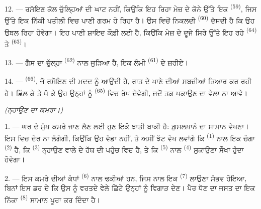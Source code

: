 12. --- ਰਸੋਇਣ ਕੋਲ ਚੁੱਲ੍ਹਿਆਂ ਦੀ ਘਾਟ ਨਹੀਂ, ਕਿਉਂਕਿ ਇਹ ਰਿਹਾ ਮੇਜ਼ ਦੇ ਕੋਨੇ ਉੱਤੇ ਇਕ
 \textsuperscript{(59)}, ਜਿਸ ਉੱਤੇ ਇਕ ਨਿੱਕੀ ਪਤੀਲੀ ਵਿਚ ਪਾਣੀ
ਗਰਮ ਹੋ ਰਿਹਾ ਹੈ। ਉਸ ਵਿਚੋਂ ਨਿਕਲਦੀ  \textsuperscript{(60)} ਦੱਸਦੀ ਹੈ ਕਿ
ਉਹ ਉਬਲ ਰਿਹਾ ਹੋਵੇਗਾ। ਇਹ ਪਾਣੀ ਸ਼ਾਇਦ ਕੌਫ਼ੀ ਲਈ ਹੈ, ਕਿਉਂਕਿ ਮੇਜ਼ ਦੇ ਦੂਜੇ ਸਿਰੇ ਉੱਤੇ ਇਹ
ਰਹੇ  \textsuperscript{(64)} ਤੇ 
\textsuperscript{(63)}।

13. --- ਗੈਸ ਦਾ ਚੁੱਲ੍ਹਾ  \textsuperscript{(62)} ਨਾਲ ਜੁੜਿਆ ਹੈ,
ਇਕ ਲੰਮੀ  \textsuperscript{(61)} ਦੇ ਜ਼ਰੀਏ।

14. ---  \textsuperscript{(66)}, ਜੋ ਰਸੋਇਣ ਦੀ ਮਦਦ ਨੂੰ
ਆਉਂਦੀ ਹੈ, ਰਾਤ ਦੇ ਖਾਣੇ ਦੀਆਂ ਸਬਜ਼ੀਆਂ ਤਿਆਰ ਕਰ ਰਹੀ ਹੈ। ਛਿੱਲ ਕੇ ਤੇ ਧੋ ਕੇ ਉਹ ਉਨ੍ਹਾਂ
ਨੂੰ  \textsuperscript{(65)} ਵਿਚ ਰੱਖ ਦੇਵੇਗੀ, ਜਦੋਂ ਤਕ ਪਕਾਉਣ ਦਾ ਵੇਲਾ ਨਾ
ਆਵੇ।

\VUsaut{4.0mm}
{\centering\fontsize{10.2pt}{10.2pt}\selectfont{} \textit{(ਨ੍ਹਾਉਣ ਦਾ ਕਮਰਾ।)}\par}
\VUsaut{3.0mm}

1. --- ਘਰ ਦੇ ਮੁੱਖ ਕਮਰੇ ਜਾਣ ਲੈਣ ਲਈ ਹੁਣ ਇਕੋ ਝਾਤੀ ਬਾਕੀ ਹੈ: ਗ਼ੁਸਲਖ਼ਾਨੇ ਦਾ ਸਾਮਾਨ
ਵੇਖਣਾ। ਇਸ ਵਿਚ ਦੇਰ ਨਾ ਲੱਗੇਗੀ, ਕਿਉਂਕਿ ਉਹ ਵੱਡਾ ਨਹੀਂ, ਤੇ ਅਸੀਂ ਝੱਟ ਵੇਖ ਲਵਾਂਗੇ ਕਿ
 \textsuperscript{(1)} ਨਾਲ ਇਕ ਚੰਗਾ  \textsuperscript{(2)} ਹੈ, ਕਿ  \textsuperscript{(3)} ਨ੍ਹਾਉਣ
ਵਾਲੇ ਦੇ ਹੱਥ ਦੀ ਪਹੁੰਚ ਵਿਚ ਹੈ, ਤੇ ਕਿ  \textsuperscript{(5)}
ਨਾਲ  \textsuperscript{(4)} ਸੁਕਾਉਣਾ ਸੌਖਾ ਹੁੰਦਾ ਹੋਵੇਗਾ।

2. --- ਇਸ ਕਮਰੇ ਦੀਆਂ ਕੰਧਾਂ  \textsuperscript{(6)} ਨਾਲ ਢਕੀਆਂ
ਹਨ, ਜਿਸ ਨਾਲ ਇਕ  \textsuperscript{(7)} ਲਾਉਣਾ ਸੰਭਵ ਹੋਇਆ, ਬਿਨਾਂ ਇਸ ਡਰ
ਦੇ ਕਿ ਉਸ ਨੂੰ ਵਰਤਦੇ ਵੇਲੇ ਛਿੱਟੇ ਉਨ੍ਹਾਂ ਨੂੰ ਵਿਗਾੜ ਦੇਣ। ਪੈਰ ਧੋਣ ਦਾ ਜਸਤ ਦਾ ਇਕ ਨਿੱਕਾ
 \textsuperscript{(8)} ਸਾਮਾਨ ਪੂਰਾ ਕਰ ਦਿੰਦਾ ਹੈ।
\VUsaut{6.0mm}
\VUfilet{22mm}
